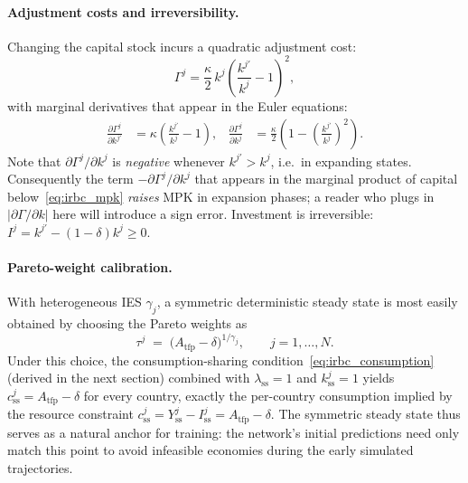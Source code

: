 \documentclass[11pt,a4paper]{report}
\begin{document}
\paragraph{Adjustment costs and irreversibility.}  Changing the capital stock incurs a quadratic adjustment cost:
\begin{equation}
\Gamma^j = \frac{\kappa}{2}\, k^j \left(\frac{k^{j\prime}}{k^j} - 1\right)^{\!2},
\label{eq:irbc_adjcost}
\end{equation}
with marginal derivatives that appear in the Euler equations:
\begin{align}
\frac{\partial \Gamma^j}{\partial k^{j\prime}} &= \kappa\left(\frac{k^{j\prime}}{k^j} - 1\right), &
\frac{\partial \Gamma^j}{\partial k^j} &= \frac{\kappa}{2}\left(1 - \left(\frac{k^{j\prime}}{k^j}\right)^{\!2}\right).
\label{eq:irbc_adjcost_derivs}
\end{align}
Note that $\partial\Gamma^j/\partial k^j$ is \emph{negative} whenever $k^{j\prime} > k^j$, i.e.\ in expanding states.  Consequently the term $-\partial\Gamma^j/\partial k^j$ that appears in the marginal product of capital below~\eqref{eq:irbc_mpk} \emph{raises} MPK in expansion phases; a reader who plugs in $|\partial\Gamma/\partial k|$ here will introduce a sign error.  Investment is irreversible: $I^j = k^{j\prime} - (1-\delta)k^j \geq 0$.

\paragraph{Pareto-weight calibration.}  With heterogeneous IES $\gamma_j$, a symmetric deterministic steady state is most easily obtained by choosing the Pareto weights as
\begin{equation}
\tau^j \;=\; \bigl(A_\mathrm{tfp} - \delta\bigr)^{1/\gamma_j}, \qquad j=1,\ldots,N.
\label{eq:pareto_calibration}
\end{equation}
Under this choice, the consumption-sharing condition~\eqref{eq:irbc_consumption} (derived in the next section) combined with $\lambda_\mathrm{ss} = 1$ and $k^j_\mathrm{ss} = 1$ yields $c^j_\mathrm{ss} = A_\mathrm{tfp} - \delta$ for every country, exactly the per-country consumption implied by the resource constraint $c^j_\mathrm{ss} = Y^j_\mathrm{ss} - I^j_\mathrm{ss} = A_\mathrm{tfp} - \delta$.  The symmetric steady state thus serves as a natural anchor for training: the network's initial predictions need only match this point to avoid infeasible economies during the early simulated trajectories.
\end{document}
